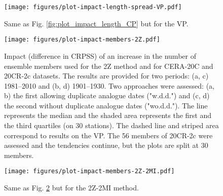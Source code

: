 \documentclass{ametsoc}
\begin{document}
\begin{figure}[t]
	\noindent\texttt{[image: figures/plot-impact-length-spread-VP.pdf]}\\
	\caption{Same as Fig. \ref{fig:plot_impact_length_CP} but for the VP.}
	\label{fig:plot_impact_length_VP}
\end{figure}

\begin{figure}[t]
	\noindent\texttt{[image: figures/plot-impact-members-2Z.pdf]}\\
	\caption{Impact (difference in CRPSS) of an increase in the number of ensemble members used for the 2Z method and for CERA-20C and 20CR-2c datasets. The results are provided for two periods: (a, c) 1981--2010 and (b, d) 1901--1930. Two approaches were assessed: (a, b) the first allowing duplicate analogue dates ("w.d.d.") and (c, d) the second without duplicate analogue dates ("wo.d.d."). The line represents the median and the shaded area represents the first and the third quartiles (on 30 stations). The dashed line and striped area correspond to results on the VP. The 56 members of 20CR-2c were assessed and the tendencies continue, but the plots are split at 30 members.}
	\label{fig:plot_impact_members_2Z}
\end{figure}

\begin{figure}[t]
	\noindent\texttt{[image: figures/plot-impact-members-2Z-2MI.pdf]}\\
	\caption{Same as Fig. \ref{fig:plot_impact_members_2Z} but for the 2Z-2MI method.}
	\label{fig:plot_impact_members_2Z-2MI}
\end{figure}
\end{document}
